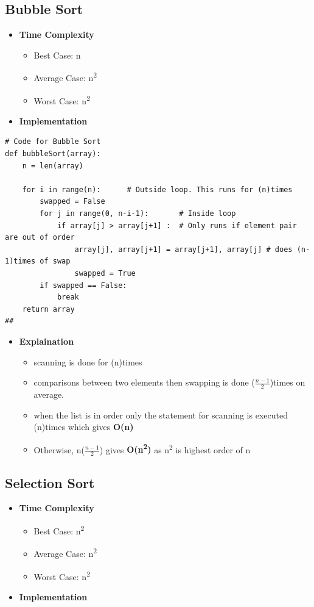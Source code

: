 \documentclass{article}
\begin{document}
\subsection{Bubble Sort}
\begin{itemize}
    \item \textbf{Time Complexity}
        \begin{itemize}
            \item Best Case: n
            \item Average Case: n\textsuperscript{2}
            \item Worst Case: n\textsuperscript{2}
        \end{itemize}
    \item \textbf{Implementation}
\end{itemize}

\begin{verbatim}
# Code for Bubble Sort
def bubbleSort(array):
    n = len(array)

    for i in range(n):      # Outside loop. This runs for (n)times
        swapped = False
        for j in range(0, n-i-1):       # Inside loop
            if array[j] > array[j+1] :  # Only runs if element pair are out of order
                array[j], array[j+1] = array[j+1], array[j] # does (n-1)times of swap
                swapped = True
        if swapped == False:
            break
    return array
##
\end{verbatim}
\begin{itemize}
    \item \textbf{Explaination}
    \begin{itemize}
        \item scanning is done for (n)times
        \item comparisons between two elements then swapping is done (\( \frac{n-1}{2} \))times on average.
        \item when the list is in order only the statement for scanning is executed (n)times which gives \textbf{O(n)}
        \item Otherwise, n(\( \frac{n-1}{2} \)) gives \textbf{O(n\textsuperscript{2})} as n\textsuperscript{2} is highest order of n
    \end{itemize}
\end{itemize}

\clearpage

\subsection{Selection Sort}
\begin{itemize}
    \item \textbf{Time Complexity}
        \begin{itemize}
            \item Best Case: n\textsuperscript{2}
            \item Average Case: n\textsuperscript{2}
            \item Worst Case: n\textsuperscript{2}
        \end{itemize}
    \item \textbf{Implementation}
\end{itemize}
\end{document}
